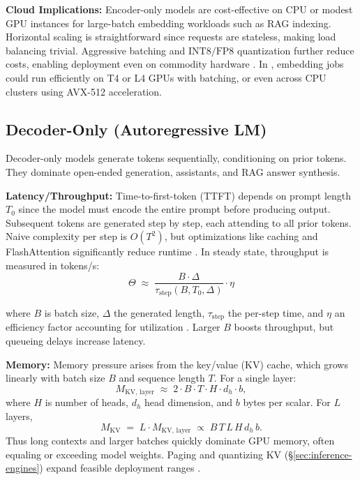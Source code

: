 \textbf{Cloud Implications:} Encoder-only models are cost-effective on CPU or modest GPU instances for large-batch embedding workloads such as RAG indexing. Horizontal scaling is straightforward since requests are stateless, making load balancing trivial. Aggressive batching and $\mathrm{INT8}/\mathrm{FP8}$ quantization further reduce costs, enabling deployment even on commodity hardware \cite{Dettmers2022LLMint8}. In \ishtar{}, embedding jobs could run efficiently on T4 or L4 GPUs with batching, or even across CPU clusters using AVX-512 acceleration.

\subsection{Decoder-Only (Autoregressive LM)}
Decoder-only models generate tokens sequentially, conditioning on prior tokens. They dominate open-ended generation, assistants, and RAG answer synthesis.

\textbf{Latency/Throughput:} Time-to-first-token (TTFT) depends on prompt length $T_0$ since the model must encode the entire prompt before producing output. Subsequent tokens are generated step by step, each attending to all prior tokens. Naive complexity per step is $O(T^2)$, but optimizations like caching and FlashAttention significantly reduce runtime \cite{Dao2023FlashAttention2}. In steady state, throughput is measured in tokens/s:
\begin{equation}
  \Theta \;\approx\; \frac{B \cdot \Delta}{\tau_{\text{step}}(B, T_0, \Delta)} \cdot \eta
\end{equation}

where $B$ is batch size, $\Delta$ the generated length, $\tau_{\text{step}}$ the per-step time, and $\eta$ an efficiency factor accounting for utilization \cite{Kwon2023vLLM,Dao2022FlashAttention}. Larger $B$ boosts throughput, but queueing delays increase latency.

\textbf{Memory:} Memory pressure arises from the key/value (KV) cache, which grows linearly with batch size $B$ and sequence length $T$. For a single layer:
\[
  M_{\text{KV, layer}} \;\approx\; 2 \cdot B \cdot T \cdot H \cdot d_h \cdot b,
\]
where $H$ is number of heads, $d_h$ head dimension, and $b$ bytes per scalar. For $L$ layers,
\[
  M_{\text{KV}} \;=\; L \cdot M_{\text{KV, layer}} \;\propto\; B\,T\,L\,H\,d_h\,b.
\]
Thus long contexts and larger batches quickly dominate GPU memory, often equaling or exceeding model weights. Paging and quantizing KV (\S\ref{sec:inference-engines}) expand feasible deployment ranges \cite{Kwon2023vLLM}.

